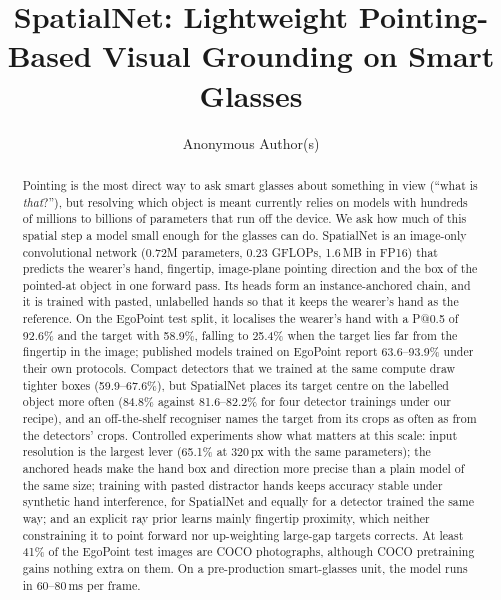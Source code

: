 \documentclass[acmsmall,screen,review,anonymous]{acmart}
\begin{document}
\title[SpatialNet]{SpatialNet: Lightweight Pointing-Based Visual Grounding on Smart Glasses}

\author{Anonymous Author(s)}

\begin{abstract}
Pointing is the most direct way to ask smart glasses about something in view (``what is \emph{that}?''), but resolving which object is meant currently relies on models with hundreds of millions to billions of parameters that run off the device. We ask how much of this spatial step a model small enough for the glasses can do. SpatialNet is an image-only convolutional network (0.72M parameters, 0.23 GFLOPs, 1.6\,MB in FP16) that predicts the wearer's hand, fingertip, image-plane pointing direction and the box of the pointed-at object in one forward pass. Its heads form an instance-anchored chain, and it is trained with pasted, unlabelled hands so that it keeps the wearer's hand as the reference. On the EgoPoint test split, it localises the wearer's hand with a P@0.5 of 92.6\% and the target with 58.9\%, falling to 25.4\% when the target lies far from the fingertip in the image; published models trained on EgoPoint report 63.6--93.9\% under their own protocols. Compact detectors that we trained at the same compute draw tighter boxes (59.9--67.6\%), but SpatialNet places its target centre on the labelled object more often (84.8\% against 81.6--82.2\% for four detector trainings under our recipe), and an off-the-shelf recogniser names the target from its crops as often as from the detectors' crops. Controlled experiments show what matters at this scale: input resolution is the largest lever (65.1\% at 320\,px with the same parameters); the anchored heads make the hand box and direction more precise than a plain model of the same size; training with pasted distractor hands keeps accuracy stable under synthetic hand interference, for SpatialNet and equally for a detector trained the same way; and an explicit ray prior learns mainly fingertip proximity, which neither constraining it to point forward nor up-weighting large-gap targets corrects. At least 41\% of the EgoPoint test images are COCO photographs, although COCO pretraining gains nothing extra on them. On a pre-production smart-glasses unit, the model runs in 60--80\,ms per frame.
\end{abstract}
\end{document}
